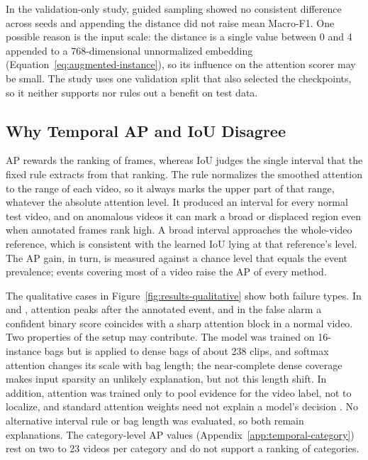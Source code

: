 In the validation-only study, guided sampling showed no consistent difference
across seeds and appending the distance did not raise mean Macro-F1. One
possible reason is the input scale: the distance is a single value between 0
and 4 appended to a 768-dimensional unnormalized embedding
(Equation~\ref{eq:augmented-instance}), so its influence on the attention scorer
may be small. The study uses one validation split that also selected the checkpoints, so it neither supports nor rules out a benefit on test data.

\subsection{Why Temporal AP and IoU Disagree}
\label{sec:discussion-temporal}

AP rewards the ranking of frames, whereas IoU judges the single interval that
the fixed rule extracts from that ranking. The rule normalizes the smoothed
attention to the range of each video, so it always marks the upper part of that
range, whatever the absolute attention level. It produced an interval for every
normal test video, and on anomalous videos it can mark a broad or displaced
region even when annotated frames rank high. A broad interval approaches the
whole-video reference, which is consistent with the learned IoU lying at that
reference's level. The AP gain, in turn, is measured against a chance level
that equals the event prevalence; events covering most of a video raise the AP
of every method.

The qualitative cases in Figure~\ref{fig:results-qualitative} show both failure
types. In  and , attention peaks after the
annotated event, and in the false alarm a confident binary score coincides with
a sharp attention block in a normal video. Two properties of the setup may
contribute. The model was trained on 16-instance bags but is applied to dense
bags of about 238 clips, and softmax attention changes its scale with bag
length; the near-complete dense coverage makes input sparsity an unlikely
explanation, but not this length shift. In addition, attention was trained only
to pool evidence for the video label, not to localize, and standard attention
weights need not explain a model's decision \cite{jain2019attention}. No alternative interval rule or bag length was evaluated, so both remain explanations. The category-level AP values
(Appendix~\ref{app:temporal-category}) rest on two to 23 videos per category and
do not support a ranking of categories.

